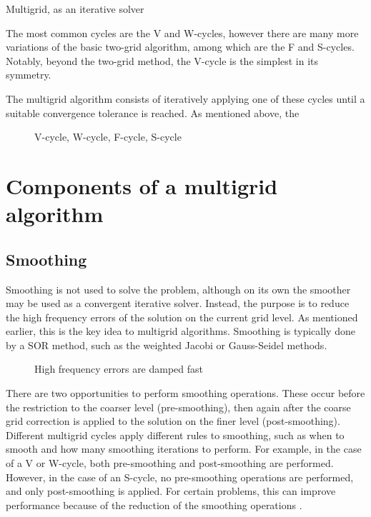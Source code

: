 Multigrid, as an iterative solver

The most common cycles are the V and W-cycles, however there are many more variations of the basic two-grid algorithm, among which are the F and S-cycles.
Notably, beyond the two-grid method, the V-cycle is the simplest in its symmetry.

The multigrid algorithm consists of iteratively applying one of these cycles until a suitable convergence tolerance is reached.
As mentioned above, the 



\begin{figure}
	\caption{V-cycle, W-cycle, F-cycle, S-cycle}
\end{figure}









\section{Components of a multigrid algorithm}

\subsection{Smoothing}

Smoothing is not used to solve the problem, although on its own the smoother may be used as a convergent iterative solver.
Instead, the purpose is to reduce the high frequency errors of the solution on the current grid level.
As mentioned earlier, this is the key idea to multigrid algorithms.
Smoothing is typically done by a SOR method, such as the weighted Jacobi or Gauss-Seidel methods.

\begin{figure}
	\caption{High frequency errors are damped fast}
\end{figure}


There are two opportunities to perform smoothing operations.
These occur before the restriction to the coarser level (pre-smoothing), then again after the coarse grid correction is applied to the solution on the finer level (post-smoothing).
Different multigrid cycles apply different rules to smoothing, such as when to smooth and how many smoothing iterations to perform.
For example, in the case of a V or W-cycle, both pre-smoothing and post-smoothing are performed.
However, in the case of an S-cycle, no pre-smoothing operations are performed, and only post-smoothing is applied.
For certain problems, this can improve performance because of the reduction of the smoothing operations \cite{iyengar}.

